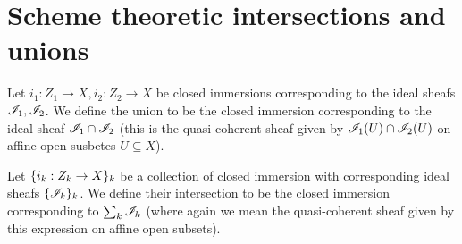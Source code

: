 \documentclass{memoir}
\begin{document}
\section{Scheme theoretic intersections and unions}
\begin{definition}
    Let $i_1:Z_1\to X,i_2:Z_2\to X$ be closed immersions corresponding to the ideal sheafs $\mathscr{I}_1,\mathscr{I}_2$.
    We define the union to be the closed immersion corresponding to the ideal sheaf $\mathscr{I}_1\cap \mathscr{I}_2$ (this is the quasi-coherent sheaf given by $\mathscr{I}_1(U)\cap \mathscr{I}_2(U)$ on affine open susbetes $U\subseteq X$).
\end{definition}
\begin{definition}
    Let $\lbrace i_k:Z_k\to X\rbrace_k$ be a collection of closed immersion with corresponding ideal sheafs $\lbrace\mathscr{I}_k\rbrace_k$.
    We define their intersection to be the closed immersion corresponding to $\sum_k\mathscr{I}_k$ (where again we mean the quasi-coherent sheaf given by this expression on affine open subsets).
\end{definition}
\end{document}
